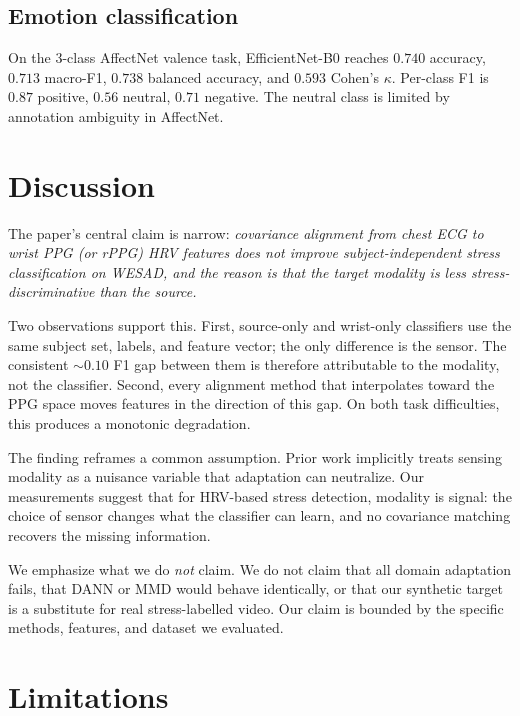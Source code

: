 \documentclass[conference]{IEEEtran}
\begin{document}
\subsection{Emotion classification}
On the 3-class AffectNet valence task, EfficientNet-B0 reaches
$0.740$ accuracy, $0.713$ macro-F1, $0.738$ balanced accuracy, and
$0.593$ Cohen's $\kappa$. Per-class F1 is $0.87$ positive, $0.56$
neutral, $0.71$ negative. The neutral class is limited by annotation
ambiguity in AffectNet.

\section{Discussion}

The paper's central claim is narrow: \emph{covariance alignment from
chest ECG to wrist PPG (or rPPG) HRV features does not improve
subject-independent stress classification on WESAD, and the reason is
that the target modality is less stress-discriminative than the
source.}

Two observations support this. First, source-only and wrist-only
classifiers use the same subject set, labels, and feature vector; the
only difference is the sensor. The consistent $\sim 0.10$ F1 gap
between them is therefore attributable to the modality, not the
classifier. Second, every alignment method that interpolates toward
the PPG space moves features in the direction of this gap. On both
task difficulties, this produces a monotonic degradation.

The finding reframes a common assumption. Prior work implicitly
treats sensing modality as a nuisance variable that adaptation can
neutralize. Our measurements suggest that for HRV-based stress
detection, modality is signal: the choice of sensor changes what the
classifier can learn, and no covariance matching recovers the missing
information.

We emphasize what we do \emph{not} claim. We do not claim that all
domain adaptation fails, that DANN or MMD would behave identically,
or that our synthetic target is a substitute for real stress-labelled
video. Our claim is bounded by the specific methods, features, and
dataset we evaluated.

\section{Limitations}
\end{document}
